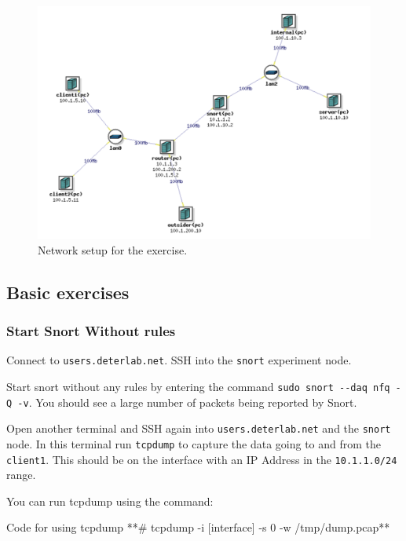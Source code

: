 \documentclass[a4paper,11pt,hidelinks]{article}
\begin{document}
\begin{figure}[h!]
    \centering
    \includegraphics[width=\textwidth]{../drawable/network.png}
    \caption{Network setup for the exercise.}
\end{figure}

\clearpage
\newpage

\subsection{Basic exercises}

\subsubsection{Start Snort Without rules}

Connect to \verb=users.deterlab.net=. SSH into the \verb=snort= experiment node.

Start snort without any rules by entering the command \verb=sudo snort --daq nfq -Q -v=. You should see a large number of packets being reported by Snort.

Open another terminal and SSH again into \verb=users.deterlab.net= and the \verb=snort= node. In this terminal run \verb=tcpdump= to capture the data going to and from the \verb=client1=. This should be on the interface with an IP Address in the \verb=10.1.1.0/24= range. 

You can run tcpdump using the command:

\begin{code}{Code for using tcpdump}
**# tcpdump -i [interface] -s 0 -w /tmp/dump.pcap**
\end{code}
    
\end{document}
